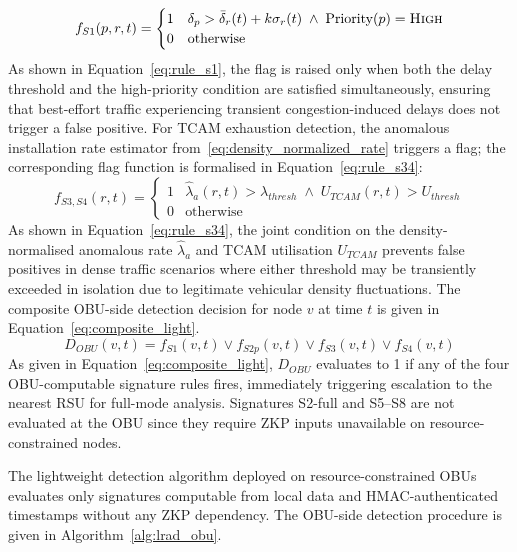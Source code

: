 \documentclass[12pt, a4paper]{report}
\begin{document}
\begin{equation}
f_{S1}(p,r,t) =
\begin{cases}
1 & \delta_p > \bar{\delta}_r(t) + k\sigma_r(t)
    \;\land\; \text{Priority}(p) = \textsc{High} \\
0 & \text{otherwise}
\end{cases}
\label{eq:rule_s1}
\end{equation}
As shown in Equation~\eqref{eq:rule_s1}, the flag is raised only
when both the delay threshold and the high-priority condition are
satisfied simultaneously, ensuring that best-effort traffic
experiencing transient congestion-induced delays does not trigger a
false positive.
For TCAM exhaustion detection, the anomalous installation rate
estimator from~\eqref{eq:density_normalized_rate} triggers a flag;
the corresponding flag function is formalised in
Equation~\eqref{eq:rule_s34}:
\begin{equation}
f_{S3,S4}(r,t) =
\begin{cases}
1 & \hat{\lambda}_a(r,t) > \lambda_{thresh}
    \;\land\; U_{TCAM}(r,t) > U_{thresh} \\
0 & \text{otherwise}
\end{cases}
\label{eq:rule_s34}
\end{equation}
As shown in Equation~\eqref{eq:rule_s34}, the joint condition on
the density-normalised anomalous rate $\hat{\lambda}_a$ and TCAM
utilisation $U_{TCAM}$ prevents false positives in dense traffic
scenarios where either threshold may be transiently exceeded in
isolation due to legitimate vehicular density fluctuations.
The composite \ac{OBU}-side detection decision for
node $v$ at time $t$ is given in
Equation~\eqref{eq:composite_light}.
\begin{equation}
D_{OBU}(v,t) = f_{S1}(v,t) \lor f_{S2p}(v,t)
\lor f_{S3}(v,t) \lor f_{S4}(v,t)
\label{eq:composite_light}
\end{equation}
As given in Equation~\eqref{eq:composite_light},
$D_{OBU}$ evaluates to 1 if any of the four
\ac{OBU}-computable signature rules fires,
immediately triggering escalation to the nearest
\ac{RSU} for full-mode analysis. Signatures S2-full
and S5--S8 are not evaluated at the \ac{OBU} since
they require \ac{ZKP} inputs unavailable on
resource-constrained nodes.

The lightweight detection algorithm deployed on
resource-constrained \ac{OBU}s evaluates only signatures
computable from local data and \ac{HMAC}-authenticated
timestamps without any \ac{ZKP} dependency.
The \ac{OBU}-side detection procedure is given in
Algorithm~\ref{alg:lrad_obu}.
\end{document}
